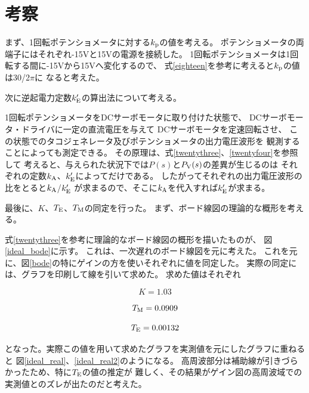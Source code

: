 \documentclass[uplatex, 11pt,a4j, titlepage]{jsarticle}
\begin{document}
\newpage

\section{考察}

まず、1回転ポテンショメータに対する$k_{\rm p}$の値を考える。
ポテンショメータの両端子にはそれぞれ-15Vと15Vの電源を接続した。
1回転ポテンショメータは1回転する間に-15Vから15Vへ変化するので、
式\ref{eighteen}を参考に考えると$k_{\rm p}$の値は30/2$\pi$に
なると考えた。

\newpage

次に逆起電力定数$k'_{\rm E}$の算出法について考える。

1回転ポテンショメータをDCサーボモータに取り付けた状態で、
DCサーボモータ・ドライバに一定の直流電圧を与えて
DCサーボモータを定速回転させ、
この状態でのタコジェネレータ及びポテンショメータの出力電圧波形を
観測することによっても測定できる。
その原理は、式\ref{twentythree}、\ref{twentyfour}を参照して
考えると、与えられた状況下では$P(s)$と$P_{\rm V}(s)$の差異が生じるのは
それぞれの定数$k_{\rm A}$、$k'_{\rm E}$によってだけである。
したがってそれぞれの出力電圧波形の比をとると$k_{\rm A}$/$k'_{\rm E}$
が求まるので、そこに$k_{\rm A}$を代入すれば$k'_{\rm E}$が求まる。

最後に、$K$、$T_{\rm E}$、$T_{\rm M}$の同定を行った。
まず、ボード線図の理論的な概形を考える。

式\ref{twentythree}を参考に理論的なボード線図の概形を描いたものが、
図\ref{ideal_bode}に示す。
これは、一次遅れのボード線図を元に考えた。
これを元に、図\ref{bode}の特にゲインの方を使いそれぞれに値を同定した。
実際の同定には、グラフを印刷して線を引いて求めた。
求めた値はそれぞれ

\begin{equation}
    K=1.03
\end{equation}

\begin{equation}
    T_{\rm M} = 0.0909
\end{equation}

\begin{equation}
    T_{\rm E} = 0.00132
\end{equation}

となった。実際この値を用いて求めたグラフを実測値を元にしたグラフに重ねると
図\ref{ideal_real}、\ref{ideal_real2}のようになる。
高周波部分は補助線が引きづらかったため、特に$T_{\rm E}$の値の推定が
難しく、その結果がゲイン図の高周波域での実測値とのズレが出たのだと考えた。
\end{document}
